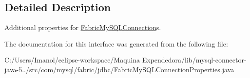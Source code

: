 \subsection{Detailed Description}
Additional properties for \mbox{\hyperlink{interfacecom_1_1mysql_1_1fabric_1_1jdbc_1_1_fabric_my_s_q_l_connection}{Fabric\+My\+S\+Q\+L\+Connection}}s. 

The documentation for this interface was generated from the following file\+:\begin{DoxyCompactItemize}
\item 
C\+:/\+Users/\+Imanol/eclipse-\/workspace/\+Maquina Expendedora/lib/mysql-\/connector-\/java-\/5../src/com/mysql/fabric/jdbc/Fabric\+My\+S\+Q\+L\+Connection\+Properties.\+java\end{DoxyCompactItemize}
